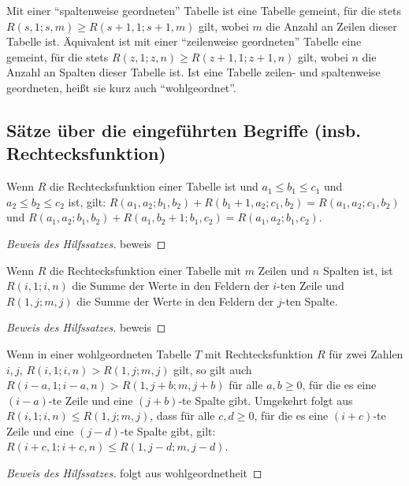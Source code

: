 \begin{definition}
    Mit einer "`spaltenweise geordneten"' Tabelle ist eine Tabelle gemeint, für die stets $R(s, 1; s, m)\geq 
    R(s+1, 1; s+1, m)$ gilt, wobei $m$ die Anzahl an Zeilen dieser Tabelle ist. Äquivalent ist mit einer 
    "`zeilenweise geordneten"' Tabelle eine gemeint, für die stets $R(z, 1; z, n)\geq R(z+1, 1; z+1, n)$ gilt, 
    wobei $n$ die Anzahl an Spalten dieser Tabelle ist. Ist eine Tabelle zeilen- und spaltenweise geordneten, heißt 
    sie kurz auch "`wohlgeordnet"'.
\end{definition}

\subsection*{Sätze über die eingeführten Begriffe (insb. Rechtecksfunktion)}

\renewcommand{\qedsymbol}{$\square$}

\begin{lem}\label{r_summe}
    Wenn $R$ die Rechtecksfunktion einer Tabelle ist und $a_1\leq b_1\leq c_1$ und $a_2\leq b_2\leq c_2$ ist, gilt: 
    $R(a_1, a_2; b_1, b_2)+R(b_1+1, a_2; c_1, b_2)=R(a_1, a_2; c_1, b_2)$ und 
    $R(a_1, a_2; b_1, b_2)+R(a_1, b_2+1; b_1, c_2)=R(a_1, a_2; b_1, c_2)$.
\end{lem}
\begin{proof}[Beweis des Hilfssatzes]
    beweis
\end{proof}
\begin{lem}\label{r_zeile_spalte}
    Wenn $R$ die Rechtecksfunktion einer Tabelle mit $m$ Zeilen und $n$ Spalten ist, ist $R(i, 1; i, n)$ die Summe 
    der Werte in den Feldern der $i$-ten Zeile und $R(1, j; m, j)$ die Summe der Werte in den Feldern der $j$-ten 
    Spalte.
\end{lem}
\begin{proof}[Beweis des Hilfssatzes]
    beweis
\end{proof}
\begin{lem}\label{mehr_nuller}
    Wenn in einer wohlgeordneten Tabelle $T$ mit Rechtecksfunktion $R$ für zwei Zahlen $i, j$, $R(i, 1; i, n)>
    R(1, j; m, j)$ gilt, so gilt auch $R(i-a, 1; i-a, n)>R(1, j+b; m, j+b)$ für alle $a, b\geq0$, für die es eine 
    $(i-a)$-te Zeile und eine $(j+b)$-te Spalte gibt. Umgekehrt folgt aus $R(i, 1; i, n)\leq R(1, j; m, j)$, dass für 
    alle $c,d\geq0$, für die es eine $(i+c)$-te Zeile und  eine $(j-d)$-te Spalte gibt, gilt: $R(i+c, 1; i+c, n)\leq 
    R(1, j-d; m, j-d)$. 
\end{lem}
\begin{proof}[Beweis des Hilfssatzes]
    folgt aus wohlgeordnetheit %
\end{proof}

